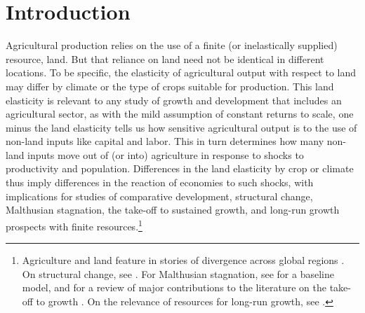 \documentclass[11pt]{article}
\begin{document}
\pagebreak 

\section{Introduction}
\onehalfspacing 
Agricultural production relies on the use of a finite (or inelastically supplied) resource, land. But that reliance on land need not be identical in different locations. To be specific, the elasticity of agricultural output with respect to land may differ by climate or the type of crops suitable for production. This land elasticity is relevant to any study of growth and development that includes an agricultural sector, as with the mild assumption of constant returns to scale, one minus the land elasticity tells us how sensitive agricultural output is to the use of non-land inputs like capital and labor. This in turn determines how many non-land inputs move out of (or into) agriculture in response to shocks to productivity and population. Differences in the land elasticity by crop or climate thus imply differences in the reaction of economies to such shocks, with implications for studies of comparative development, structural change, Malthusian stagnation, the take-off to sustained growth, and long-run growth prospects with finite resources.\footnote{Agriculture and land feature in stories of divergence across global regions \citep{kp2001,galor2008trading,vollrath2011,vv08,vv13,cs2015}. On structural change, see \cite{Gollin:2007oq,Restuccia:2008hc,weilwilde2009,Gollin:2010ys,ev2016clim}. For Malthusian stagnation, see \cite{ashraf2010dynamics} for a baseline model, and \citet{Galor:2011uq} for a review of major contributions to the literature on the take-off to growth \citep{gw00,galor2002natural,Hansen:2002fk,doepke2004accounting,cs2005,lagerlof2006,craftsmills2009,strulik2008population}. On the relevance of resources for long-run growth, see \cite{perettovalente2015}.} 
\end{document}
